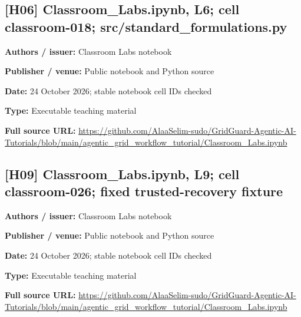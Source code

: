 \documentclass[10pt,letterpaper]{article}
\begin{document}
\subsection*{[H06] Classroom\_Labs.ipynb, L6; cell classroom-018; src/standard\_formulations.py}
\textbf{Authors / issuer:} Classroom Labs notebook\par
\textbf{Publisher / venue:} Public notebook and Python source\par
\textbf{Date:} 24 October 2026; stable notebook cell IDs checked\par
\textbf{Type:} Executable teaching material\par
\textbf{Full source URL:} \href{https://github.com/AlaaSelim-sudo/GridGuard-Agentic-AI-Tutorials/blob/main/agentic_grid_workflow_tutorial/Classroom_Labs.ipynb}{\small\ttfamily https:/\allowbreak{}/\allowbreak{}github.\allowbreak{}com/\allowbreak{}AlaaSelim-\allowbreak{}sudo/\allowbreak{}GridGuard-\allowbreak{}Agentic-\allowbreak{}AI-\allowbreak{}Tutorials/\allowbreak{}blob/\allowbreak{}main/\allowbreak{}agentic\_\allowbreak{}grid\_\allowbreak{}workflow\_\allowbreak{}tutorial/\allowbreak{}Classroom\_\allowbreak{}Labs.\allowbreak{}ipynb}\par
\par\medskip
\subsection*{[H09] Classroom\_Labs.ipynb, L9; cell classroom-026; fixed trusted-recovery fixture}
\textbf{Authors / issuer:} Classroom Labs notebook\par
\textbf{Publisher / venue:} Public notebook and Python source\par
\textbf{Date:} 24 October 2026; stable notebook cell IDs checked\par
\textbf{Type:} Executable teaching material\par
\textbf{Full source URL:} \href{https://github.com/AlaaSelim-sudo/GridGuard-Agentic-AI-Tutorials/blob/main/agentic_grid_workflow_tutorial/Classroom_Labs.ipynb}{\small\ttfamily https:/\allowbreak{}/\allowbreak{}github.\allowbreak{}com/\allowbreak{}AlaaSelim-\allowbreak{}sudo/\allowbreak{}GridGuard-\allowbreak{}Agentic-\allowbreak{}AI-\allowbreak{}Tutorials/\allowbreak{}blob/\allowbreak{}main/\allowbreak{}agentic\_\allowbreak{}grid\_\allowbreak{}workflow\_\allowbreak{}tutorial/\allowbreak{}Classroom\_\allowbreak{}Labs.\allowbreak{}ipynb}\par
\par\medskip
\end{document}
